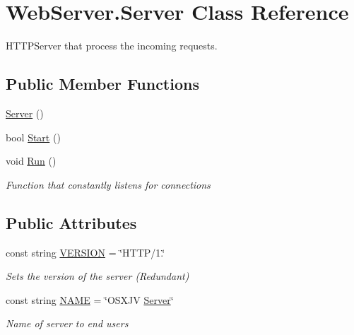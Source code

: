 \hypertarget{class_web_server_1_1_server}{}\section{Web\+Server.\+Server Class Reference}
\label{class_web_server_1_1_server}


H\+T\+T\+P\+Server that process the incoming requests.  


\subsection*{Public Member Functions}
\begin{DoxyCompactItemize}
\item 
\hyperlink{class_web_server_1_1_server_ad330bfa277d422d82793bc5f6de83ad4}{Server} ()
\item 
bool \hyperlink{class_web_server_1_1_server_af6882e9fbb66cb27880198a0c0bb301b}{Start} ()
\item 
void \hyperlink{class_web_server_1_1_server_a83ce026fab9839ed0ca193977c50bb7b}{Run} ()
\begin{DoxyCompactList}\small\item\em Function that constantly listens for connections \end{DoxyCompactList}\end{DoxyCompactItemize}
\subsection*{Public Attributes}
\begin{DoxyCompactItemize}
\item 
const string \hyperlink{class_web_server_1_1_server_a53e42e0cb8e8839b6afb16828752a393}{V\+E\+R\+S\+I\+ON} = \char`\"{}H\+T\+TP/1.\char`\"{}
\begin{DoxyCompactList}\small\item\em Sets the version of the server (Redundant) \end{DoxyCompactList}\item 
const string \hyperlink{class_web_server_1_1_server_ad29c5c6d114c3c384e67f7554f9f7afe}{N\+A\+ME} = \char`\"{}O\+S\+X\+JV \hyperlink{class_web_server_1_1_server}{Server}\char`\"{}
\begin{DoxyCompactList}\small\item\em Name of server to end users \end{DoxyCompactList}\end{DoxyCompactItemize}
